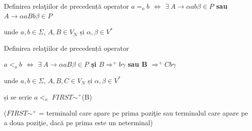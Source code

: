 \documentclass[pdf]{beamer}
\begin{document}
\begin{frame}{Definirea relaţiilor de precedență operator}
\textbf{$a =_o b$ $\Leftrightarrow$ $\exists \  A \rightarrow \alpha a b \beta \in P$  sau $ A \rightarrow \alpha a B b \beta \in P$}
\newline

unde $a,b \in \Sigma$, $A,B \in V_N$ și $\alpha, \beta \in V^*$

\begin{figure}[!htb]
\begin{minipage}{0.48\textwidth}
\centering
\end{minipage}\hfill
\begin{minipage}{0.48\textwidth}
\centering
\end{minipage}\hfill
\end{figure}
\end{frame}



\begin{frame}{Definirea relaţiilor de precedență operator}

\textbf{$a <_{o} b$ $\Leftrightarrow$ $\exists \ A \rightarrow \alpha a B\beta \in P$ și $B \Rightarrow^{+} b \gamma$ sau B $\Rightarrow^+ C b\gamma$}
\newline

unde $a,b \in \Sigma$, $A,B,C \in V_N$ și $\alpha, \beta \in V^*$

și se scrie $a <_{o}$ $FIRST\sim^+$(B)
\newline

($FIRST\sim^+$ = terminalul care apare pe prima poziţie sau terminalul care apare pe a doua poziţie, dacă pe prima este un neterminal)

\begin{figure}[!htb]
\begin{minipage}{0.48\textwidth}
\centering
\end{minipage}\hfill
\begin{minipage}{0.48\textwidth}
\centering
\end{minipage}\hfill
\end{figure}
\end{frame}
\end{document}
